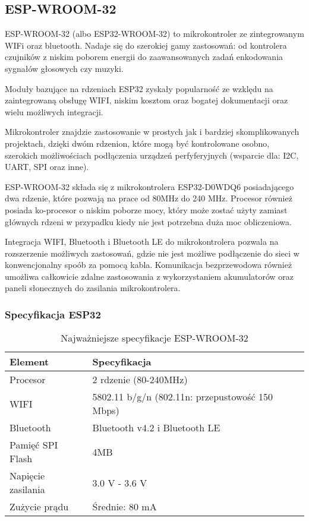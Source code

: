 \documentclass[12pt,a4paper]{article}
\begin{document}
\subsection{ESP-WROOM-32}
ESP-WROOM-32 (albo ESP32-WROOM-32) to mikrokontroler ze zintegrowanym WIFi oraz bluetooth. Nadaje się do szerokiej gamy zastosowań:
od kontrolera czujników z niskim poborem energii do zaawansowanych zadań enkodowania sygnałów głosowych czy muzyki.

Moduły bazujące na rdzeniach ESP32 zyskały popularność ze wzklędu na zaintegrowaną obsługę WIFI, 
niskim kosztom oraz bogatej dokumentacji oraz wielu możliwych integracji.

Mikrokontroler znajdzie zastosowanie w prostych jak i bardziej skomplikowanych projektach, dzięki dwóm rdzenion, które mogą być kontrolowane osobno,
szerokich możliwościach podłączenia urządzeń perfyferyjnych (wsparcie dla: I2C, UART, SPI oraz inne).

ESP-WROOM-32 składa się z mikrokontrolera ESP32-D0WDQ6 posiadającego dwa rdzenie, które pozwają na prace od 80MHz do 240 MHz. Procesor również
posiada ko-procesor o niskim poborze mocy, który może zostać użyty zamiast głównych rdzeni w przypadku kiedy nie jest potrzebna duża moc obliczeniowa.

Integracja WIFI, Bluetooth i Bluetooth LE do mikrokontrolera pozwala na rozszerzenie możliwych zastosowań, gdzie nie jest możliwe podłączenie do sieci
w konwencjonalny spoób za pomocą kabla. Komunikacja bezprzewodowa również umożliwa całkowicie zdalne zastosowania z wykorzystaniem akumulatorów
oraz paneli słonecznych do zasilania mikrokontrolera.

\subsubsection{Specyfikacja ESP32}

\begin{table}[H]
    \centering
    \begin{tabular}{|l|l|}
        \hline
        Element & Specyfikacja \\
        \hline
        Procesor & 2 rdzenie (80-240MHz) \\
        \hline
        WIFI & 5802.11 b/g/n (802.11n: przepustowość 150 Mbps) \\
        \hline
        Bluetooth & Bluetooth v4.2 i Bluetooth LE \\
        \hline
        Pamięć SPI Flash & 4MB \\
        \hline
        Napięcie zasilania & 3.0 V - 3.6 V \\
        \hline
        Zużycie prądu & Średnie: 80 mA \\
        \hline
    \end{tabular}
    \caption{Najważniejsze specyfikacje ESP-WROOM-32}
    \label{esp32-spec}
\end{table}
\end{document}
